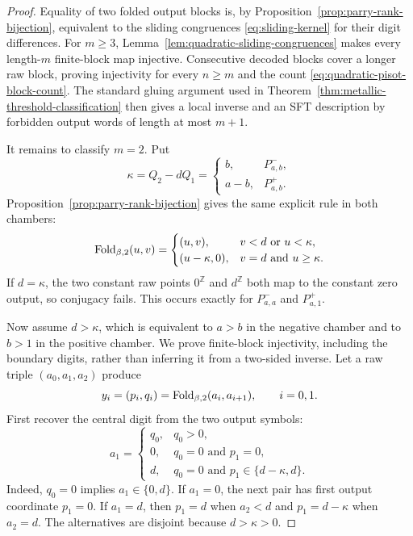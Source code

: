 \begin{proof}
Equality of two folded output blocks is, by
Proposition~\ref{prop:parry-rank-bijection}, equivalent to the sliding
congruences \eqref{eq:sliding-kernel} for their digit differences.  For
$m\ge3$, Lemma~\ref{lem:quadratic-sliding-congruences} makes every
length-$m$ finite-block map injective.  Consecutive decoded blocks cover a
longer raw block, proving injectivity for every $n\ge m$ and the count
\eqref{eq:quadratic-pisot-block-count}.  The standard gluing argument used in
Theorem~\ref{thm:metallic-threshold-classification} then gives a local inverse
and an SFT description by forbidden output words of length at most $m+1$.

It remains to classify $m=2$.  Put
\[
\kappa=Q_2-dQ_1=
\begin{cases}b,&P^-_{a,b},\\ a-b,&P^+_{a,b}.
\end{cases}
\]
Proposition~\ref{prop:parry-rank-bijection} gives the same explicit rule in
both chambers:
\[
\mathrm{Fold}_{\beta,2}(u,v)=
\begin{cases}
(u,v),&v<d\text{ or }u<\kappa,\\
(u-\kappa,0),&v=d\text{ and }u\ge\kappa.
\end{cases}
\]
If $d=\kappa$, the two constant raw points
$0^{\mathbb Z}$ and $d^{\mathbb Z}$ both map to the constant zero output,
so conjugacy fails.  This occurs exactly for $P^-_{a,a}$ and $P^+_{a,1}$.

Now assume $d>\kappa$, which is equivalent to $a>b$ in the negative chamber
and to $b>1$ in the positive chamber.  We prove finite-block injectivity,
including the boundary digits, rather than inferring it from a two-sided
inverse.  Let a raw triple $(a_0,a_1,a_2)$ produce
\[
y_i=(p_i,q_i)=\mathrm{Fold}_{\beta,2}(a_i,a_{i+1}),\qquad i=0,1.
\]
First recover the central digit from the two output symbols:
\begin{equation}
a_1=
\begin{cases}
q_0,&q_0>0,\\
0,&q_0=0\text{ and }p_1=0,\\
d,&q_0=0\text{ and }p_1\in\{d-\kappa,d\}.
\end{cases}
\label{eq:m2-central-decoder}
\end{equation}
Indeed, $q_0=0$ implies $a_1\in\{0,d\}$.  If $a_1=0$, the next pair has
first output coordinate $p_1=0$.  If $a_1=d$, then $p_1=d$ when
$a_2<d$ and $p_1=d-\kappa$ when $a_2=d$.  The alternatives are disjoint
because $d>\kappa>0$.


\end{proof}

